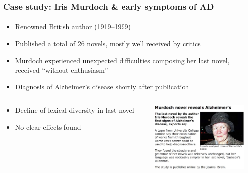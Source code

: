 \documentclass[t]{beamer} %
\begin{document}
\begin{frame}
  \frametitle{Case study: Iris Murdoch \& early symptoms of AD}
  \framesubtitle{\citep{Evert:Wankerl:Noeth:17}}

  \ungap[1]
  \begin{itemize}
  \item Renowned British author (1919--1999)
  \item Published a total of 26 novels, mostly well received by critics
  \item Murdoch experienced unexpected difficulties composing her last novel, received ``without enthusiasm'' \citep{Garrard:etc:05}
  \item Diagnosis of Alzheimer's disease shortly after publication
  \end{itemize}

  \gap[.5]
  \begin{columns}[c]
    \begin{column}{5cm}
      \begin{itemize}
      \item Decline of lexical diversity in last novel\\
        \citep{Garrard:etc:05,Pakhomov:etc:11}
      \item No clear effects found\\ \citep{Le:etc:11}
      \end{itemize}
    \end{column}
    \begin{column}{4.8cm}
      \tiny{}
      \includegraphics[width=4.8cm]{img/murdoch_bbc_story}\\
    \end{column}
  \end{columns}
\end{frame}
\end{document}
